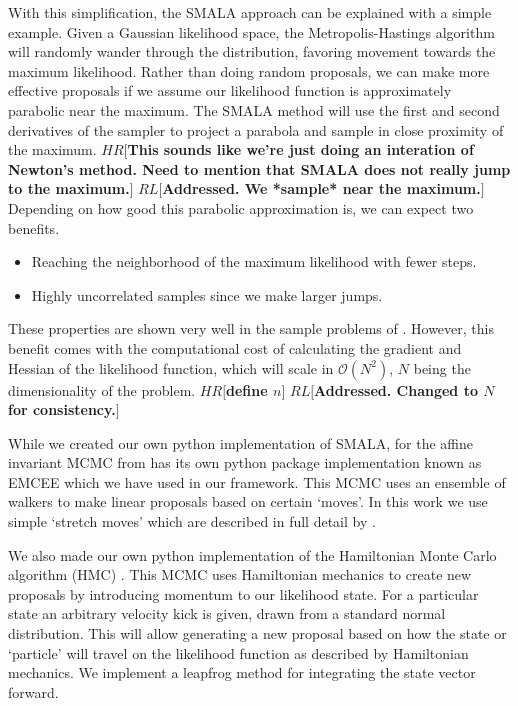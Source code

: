 \documentclass{aa}
\def\memohr#1{\color{blue}$HR[${\bf #1}$]$ \color{black}}
\def\memorl#1{\color{gray}$RL[${\bf #1}$]$ \color{black}}
\begin{document}
With this simplification, the SMALA approach can be explained with a simple example. 
Given a Gaussian likelihood space, the Metropolis-Hastings algorithm will randomly wander through the distribution, favoring movement towards the maximum likelihood.
Rather than doing random proposals, we can make more effective proposals if we assume our likelihood function is approximately parabolic near the maximum. 
The SMALA method will use the first and second derivatives of the sampler to project a parabola and sample in close proximity of the maximum. 
\memohr{This sounds like we're just doing an interation of Newton's method. Need to mention that SMALA does not really jump to the maximum.}
\memorl{Addressed. We *sample* near the maximum.}
Depending on how good this parabolic approximation is, we can expect two benefits.
\begin{itemize}
\item Reaching the neighborhood of the maximum likelihood with fewer steps.
\item Highly uncorrelated samples since we make larger jumps.
\end{itemize}
These properties are shown very well in the sample problems of \cite{Girolami2011}. 
However, this benefit comes with the computational cost of calculating the gradient and Hessian of the likelihood function, which will scale in $\mathcal{O}(N^2)$, $N$ being the dimensionality of the problem. 
\memohr{define $n$}
\memorl{Addressed. Changed to $N$ for consistency.}

While we created our own python implementation of SMALA, for the affine invariant MCMC from \cite{Goodman2010} has its own python package implementation known as EMCEE \citep{Foreman-Mackey2013} which we have used in our framework. 
This MCMC uses an ensemble of walkers to make linear proposals based on certain `moves'. 
In this work we use simple `stretch moves' which are described in full detail by \cite{Foreman-Mackey2013}. 

We also made our own python implementation of the Hamiltonian Monte Carlo algorithm (HMC) \citep{Duane1987}.
This MCMC uses Hamiltonian mechanics to create new proposals by introducing momentum to our likelihood state. 
For a particular state an arbitrary velocity kick is given, drawn from a standard normal distribution. 
This will allow generating a new proposal based on how the state or `particle' will travel on the likelihood function as described by Hamiltonian mechanics. 
We implement a leapfrog method for integrating the state vector forward.
\end{document}
